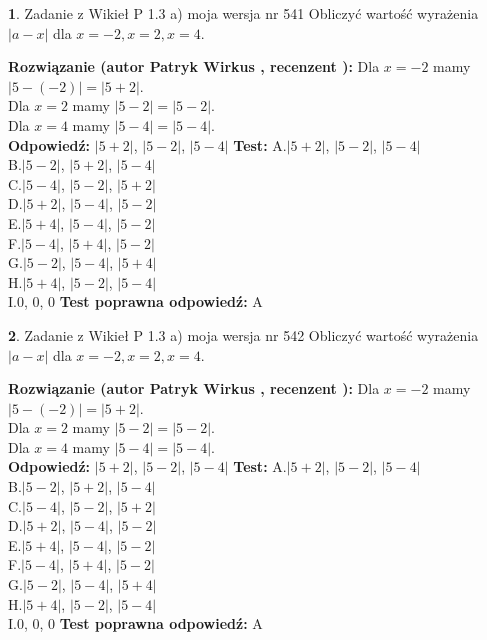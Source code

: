 \documentclass[12pt, a4paper]{article}
\theoremstyle{definition} %
\newtheorem{zad}{}
\newcommand{\zadStart}[1]{\begin{zad}#1\newline}
\newcommand{\zadStop}{\end{zad}}
\newcommand{\rozwStart}[2]{\noindent \textbf{Rozwiązanie (autor #1 , recenzent #2): }\newline}
\newcommand{\rozwStop}{\newline}
\newcommand{\odpStart}{\noindent \textbf{Odpowiedź:}\newline}
\newcommand{\odpStop}{\newline}
\newcommand{\testStart}{\noindent \textbf{Test:}\newline}
\newcommand{\testStop}{\newline}
\newcommand{\kluczStart}{\noindent \textbf{Test poprawna odpowiedź:}\newline}
\newcommand{\kluczStop}{\newline}
\begin{document}
\zadStart{Zadanie z Wikieł P 1.3 a) moja wersja nr 541}
Obliczyć wartość wyrażenia $|a - x|$ dla $x=-2,x=2,x=4$.
\zadStop
\rozwStart{Patryk Wirkus}{}
Dla $x = -2$ mamy $|5 - (-2)| = |5 + 2|$.\\
Dla $x = 2$ mamy $|5 - 2| = |5 - 2|$.\\
Dla $x = 4$ mamy $|5 - 4| = |5 - 4|$.\\
\rozwStop
\odpStart
$|5 + 2|$, $|5 - 2|$, $|5 - 4|$
\odpStop
\testStart
A.$|5 + 2|$, $|5 - 2|$, $|5 - 4|$\\
B.$|5 - 2|$, $|5 + 2|$, $|5 - 4|$\\
C.$|5 - 4|$, $|5 - 2|$, $|5 + 2|$\\
D.$|5 + 2|$, $|5 - 4|$, $|5 - 2|$\\
E.$|5 + 4|$, $|5 - 4|$, $|5 - 2|$\\
F.$|5 - 4|$, $|5 + 4|$, $|5 - 2|$\\
G.$|5 - 2|$, $|5 - 4|$, $|5 + 4|$\\
H.$|5 + 4|$, $|5 - 2|$, $|5 - 4|$\\
I.$0$, $0$, $0$
\testStop
\kluczStart
A
\kluczStop



\zadStart{Zadanie z Wikieł P 1.3 a) moja wersja nr 542}
Obliczyć wartość wyrażenia $|a - x|$ dla $x=-2,x=2,x=4$.
\zadStop
\rozwStart{Patryk Wirkus}{}
Dla $x = -2$ mamy $|5 - (-2)| = |5 + 2|$.\\
Dla $x = 2$ mamy $|5 - 2| = |5 - 2|$.\\
Dla $x = 4$ mamy $|5 - 4| = |5 - 4|$.\\
\rozwStop
\odpStart
$|5 + 2|$, $|5 - 2|$, $|5 - 4|$
\odpStop
\testStart
A.$|5 + 2|$, $|5 - 2|$, $|5 - 4|$\\
B.$|5 - 2|$, $|5 + 2|$, $|5 - 4|$\\
C.$|5 - 4|$, $|5 - 2|$, $|5 + 2|$\\
D.$|5 + 2|$, $|5 - 4|$, $|5 - 2|$\\
E.$|5 + 4|$, $|5 - 4|$, $|5 - 2|$\\
F.$|5 - 4|$, $|5 + 4|$, $|5 - 2|$\\
G.$|5 - 2|$, $|5 - 4|$, $|5 + 4|$\\
H.$|5 + 4|$, $|5 - 2|$, $|5 - 4|$\\
I.$0$, $0$, $0$
\testStop
\kluczStart
A
\kluczStop
\end{document}

